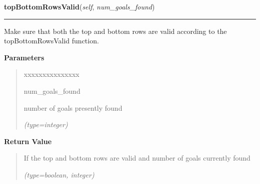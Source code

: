 \hspace{.8\funcindent}\begin{boxedminipage}{\funcwidth}

    \raggedright \textbf{topBottomRowsValid}(\textit{self}, \textit{num\_goals\_found})

    \vspace{-1.5ex}

    \rule{\textwidth}{0.5\fboxrule}
\setlength{\parskip}{2ex}
    Make sure that both the top and bottom rows are valid according to the 
    topBottomRowsValid function.

\setlength{\parskip}{1ex}
      \textbf{Parameters}
      \vspace{-1ex}

      \begin{quote}
        \begin{Ventry}{xxxxxxxxxxxxxxx}

          \item[num\_goals\_found]

          number of goals presently found

            {\it (type=integer)}

        \end{Ventry}

      \end{quote}

      \textbf{Return Value}
    \vspace{-1ex}

      \begin{quote}
      If the top and bottom rows are valid and number of goals currently 
      found

      {\it (type=boolean, integer)}

      \end{quote}

    \end{boxedminipage}

    \label{UnBlockMe:Map:Map:Map:midRowsValid}

    \vspace{0.5ex}

